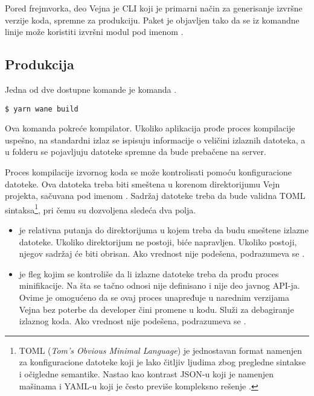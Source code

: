 Pored frejmvorka, deo Vejna je CLI koji je primarni način za generisanje izvršne verzije koda, spremne za produkciju.
Paket je objavljen tako da se iz komandne linije može koristiti izvršni modul pod imenom .

\subsection{Produkcija}

Jedna od dve dostupne komande je komanda .

\begin{verbatim}
$ yarn wane build
\end{verbatim}

Ova komanda pokreće kompilator.
Ukoliko aplikacija prođe proces kompilacije uspešno, na standardni izlaz se ispisuju informacije o veličini izlaznih datoteka, a u  folderu se pojavljuju datoteke spremne da bude prebačene na server.

Proces kompilacije izvornog koda se može kontrolisati pomoću konfiguracione datoteke.
Ova datoteka treba biti smeštena u korenom direktorijumu Vejn projekta, sačuvana pod imenom .
Sadržaj datoteke treba da bude validna TOML sintaksa\footnote{TOML (\textsl{Tom's Obvious Minimal Language}) je jednostavan format namenjen za konfiguracione datoteke koji je lako čitljiv ljudima zbog pregledne sintakse i očigledne semantike. Nastao kao kontrast JSON-u koji je namenjen mašinama i YAML-u koji je često previše kompleksno rešenje \cite{toml:spec}.}, pri čemu su dozvoljena sledeća dva polja.

\begin{itemize}
\item {} je relativna putanja do direktorijuma u kojem treba da budu smeštene izlazne datoteke.
  Ukoliko direktorijum ne postoji, biće napravljen.
  Ukoliko postoji, njegov sadržaj će biti obrisan.
  Ako vrednost nije podešena, podrazumeva se .
\item {} je fleg kojim se kontroliše da li izlazne datoteke treba da prođu proces minifikacije.
  Na šta se tačno odnosi  nije definisano i nije deo javnog API-ja.
  Ovime je omogućeno da se ovaj proces unapređuje u narednim verzijama Vejna bez poterbe da developer čini promene u kodu.
  Služi za debagiranje izlaznog koda.
  Ako vrednost nije podešena, podrazumeva se .
\end{itemize}

